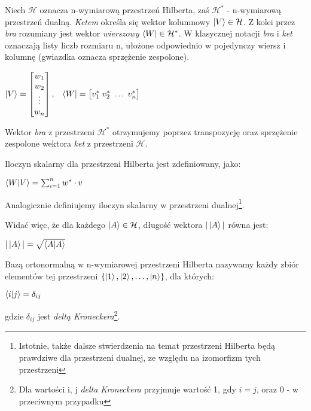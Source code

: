 \documentclass[12pt,a4paper,twoside,openany]{book}
\begin{document}
Niech $\mathcal{H}$ oznacza n-wymiarową przestrzeń Hilberta, zaś $\mathcal{H}^\ast$ - n-wymiarową przestrzeń dualną. \textit{Ketem} określa się wektor kolumnowy $\ket{V}\in\mathcal{H}$. Z kolei przez \textit{bra} rozumiany jest wektor \textit{wierszowy} $\bra{W}\in\mathcal{H}^\ast$. W klasycznej notacji \textit{bra} i \textit{ket} oznaczają listy liczb rozmiaru n, ułożone odpowiednio w pojedynczy wiersz i kolumnę (gwiazdka oznacza sprzężenie zespolone).
~\newline
~\newline
\begin{center}
    

$\ket{V} = \begin{bmatrix}
           w_{1} \\
           w_{2} \\
           \vdots \\
           w_{n}
           \end{bmatrix}, \;\;\; \bra{W} = \begin{bmatrix}
           v_{1}^\ast \; 
           v_{2}^\ast \;
           \hdots \;
           v_{n}^\ast
           \end{bmatrix}$
\end{center}

Wektor \textit{bra} z przestrzeni $\mathcal{H}^\ast$ otrzymujemy poprzez transpozycję oraz sprzężenie zespolone wektora \textit{ket} z przestrzeni $\mathcal{H}$.\newline

Iloczyn skalarny dla przestrzeni Hilberta jest zdefiniowany, jako:
\begin{center}
$\bra{W}\ket{V} = \sum_{i=1}^{n} w^\ast \cdot v$
\end{center}
Analogicznie definiujemy iloczyn skalarny w przestrzeni dualnej\footnote{Istotnie, także dalsze stwierdzenia na temat przestrzeni Hilberta będą prawdziwe dla przestrzeni dualnej, ze względu na izomorfizm tych przestrzeni}.\newline

Widać więc, że dla każdego $\ket{A}\in\mathcal{H}$, długość wektora $|\ket{A}|$ równa jest:
\begin{center}
    $|\ket{A}| = \sqrt{\braket{A}}$
\end{center}

Bazą ortonormalną w n-wymiarowej przestrzeni Hilberta nazywamy każdy zbiór elementów tej przestrzeni $\{\ket{1}, \ket{2}, \hdots, \ket{n}\}$, dla których:
\begin{center}
    $\bra{i}\ket{j} = \delta_{ij}$
\end{center}
gdzie $\delta_{ij}$ jest \textit{deltą Kroneckera}\footnote{Dla wartości i, j \textit{delta Kroneckera} przyjmuje wartość 1, gdy $i = j$, oraz 0 - w przeciwnym przypadku}.
\end{document}

